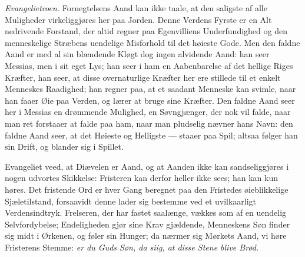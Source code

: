 \documentclass[12pt,a4paper]{book}
\begin{document}
\emph{Evangelietroen.} Fornegtelsens Aand kan ikke taale, at den saligste af alle
Muligheder virkeliggjøres her paa Jorden. Denne Verdens Fyrste er en Alt nedrivende
Forstand, der altid regner paa Egenvilliens Underfundighed og den menneskelige Stræbens
uendelige Misforhold til det høieste Gode. Men den faldne Aand er med al sin blændende
Kløgt dog ingen alvidende Aand: han seer Messias, men i sit eget Lys; han seer i ham en
Aabenbarelse af det hellige Riges Kræfter, han seer, at disse overnaturlige Kræfter her
ere stillede til et enkelt Menneskes Raadighed; han regner paa, at et saadant Menneske kan
svimle, naar han faaer Øie paa Verden, og lærer at bruge sine Kræfter. Den faldne Aand
seer her i Messias en drømmende Mulighed, en Søvngjænger, der nok vil falde, naar man ret
forstaaer at falde paa ham, naar man pludselig nævner hans Navn: den faldne Aand seer, at
det Høieste og Helligste --- staaer paa Spil; altsaa følger han sin Drift, og blander sig
i Spillet.

Evangeliet veed, at Diævelen er Aand, og at Aanden ikke kan sandseliggjøres i nogen
udvortes Skikkelse: Fristeren kan derfor heller ikke sees; han kan kun høres. Det
fristende Ord er hver Gang beregnet paa den Fristedes øieblikkelige Sjæletilstand,
forsaavidt denne lader sig bestemme ved et uvilkaarligt Verdensindtryk. Frelseren, der har
fastet saalænge, vækkes som af en
uendelig Selvfordybelse; Endeligheden gjør sine Krav gjældende, Menneskens Søn finder sig
midt i Ørkenen, og føler sin Hunger; da nærmer sig Mørkets Aand, vi høre Fristerens
Stemme: \emph{er du Guds Søn, da siig, at disse Stene blive Brød.}
\end{document}
